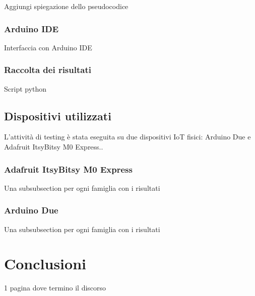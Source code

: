 \documentclass{report}
\begin{document}
Aggiungi spiegazione dello pseudocodice

\subsection{Arduino IDE}

Interfaccia con Arduino IDE

\subsection{Raccolta dei risultati}

Script python

\section{Dispositivi utilizzati}

L'attività di testing è stata eseguita su due dispositivi IoT fisici: Arduino Due e Adafruit ItsyBitsy M0 Express..

\subsection{Adafruit ItsyBitsy M0 Express}

Una subsubsection per ogni famiglia con i risultati

\subsection{Arduino Due}

Una subsubsection per ogni famiglia con i risultati

\newpage

\chapter{Conclusioni}

1 pagina dove termino il discorso

\newpage
\end{document}
